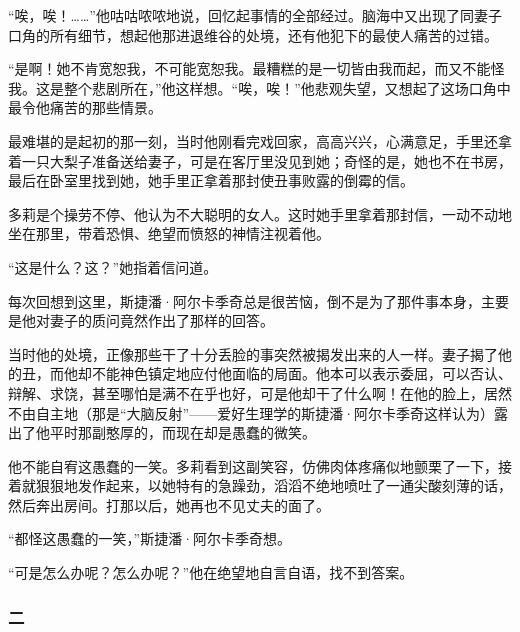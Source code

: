 \par “唉，唉！……”他咕咕哝哝地说，回忆起事情的全部经过。脑海中又出现了同妻子口角的所有细节，想起他那进退维谷的处境，还有他犯下的最使人痛苦的过错。
\par “是啊！她不肯宽恕我，不可能宽恕我。最糟糕的是一切皆由我而起，而又不能怪我。这是整个悲剧所在，”他这样想。“唉，唉！”他悲观失望，又想起了这场口角中最令他痛苦的那些情景。
\par 最难堪的是起初的那一刻，当时他刚看完戏回家，高高兴兴，心满意足，手里还拿着一只大梨子准备送给妻子，可是在客厅里没见到她；奇怪的是，她也不在书房，最后在卧室里找到她，她手里正拿着那封使丑事败露的倒霉的信。
\par 多莉是个操劳不停、他认为不大聪明的女人。这时她手里拿着那封信，一动不动地坐在那里，带着恐惧、绝望而愤怒的神情注视着他。
\par “这是什么？这？”她指着信问道。
\par 每次回想到这里，斯捷潘·阿尔卡季奇总是很苦恼，倒不是为了那件事本身，主要是他对妻子的质问竟然作出了那样的回答。
\par 当时他的处境，正像那些干了十分丢脸的事突然被揭发出来的人一样。妻子揭了他的丑，而他却不能神色镇定地应付他面临的局面。他本可以表示委屈，可以否认、辩解、求饶，甚至哪怕是满不在乎也好，可是他却干了什么啊！在他的脸上，居然不由自主地（那是“大脑反射”——爱好生理学的斯捷潘·阿尔卡季奇这样认为）露出了他平时那副憨厚的，而现在却是愚蠢的微笑。
\par 他不能自宥这愚蠢的一笑。多莉看到这副笑容，仿佛肉体疼痛似地颤栗了一下，接着就狠狠地发作起来，以她特有的急躁劲，滔滔不绝地喷吐了一通尖酸刻薄的话，然后奔出房间。打那以后，她再也不见丈夫的面了。
\par “都怪这愚蠢的一笑，”斯捷潘·阿尔卡季奇想。
\par “可是怎么办呢？怎么办呢？”他在绝望地自言自语，找不到答案。

\subsubsection*{二}

